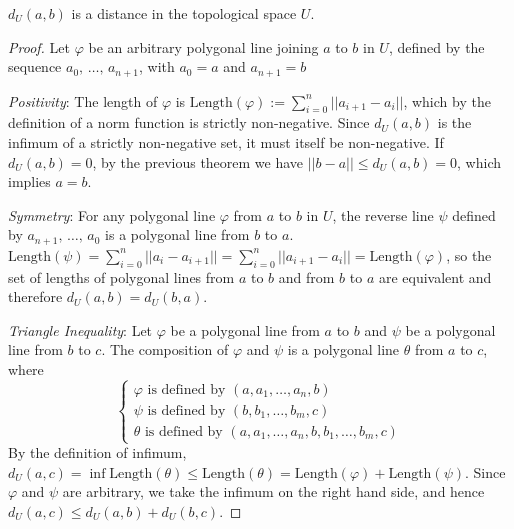 \begin{theorem}
    \label{thm:d_U_is_a_distance}
    \leanok
    $d_U(a,b)$ is a distance in the topological space $U$.
\end{theorem}
\begin{proof}
    Let $\varphi$ be an arbitrary polygonal line joining $a$ to $b$ in $U$,
    defined by the sequence $a_0,\, \dots,\, a_{n + 1}$, with $a_0 = a$ and $a_{n + 1} = b$

    \textit{Positivity}:
    The length of $\varphi$ is $\text{Length}(\varphi) := \sum_{i=0}^{n}||a_{i + 1} - a_i||$,
    which by the definition of a norm function is strictly non-negative.
    Since $d_U(a,b)$ is the infimum of a strictly non-negative set, it must itself be non-negative.
    If $d_U(a,b) = 0$, by the previous theorem we have $||b - a|| \leq d_U(a,b) = 0$,
    which implies $a = b$.

    \textit{Symmetry}:
    For any polygonal line $\varphi$ from $a$ to $b$ in $U$,
    the reverse line $\psi$ defined by $a_{n+1},\, \dots,\, a_0$ is a polygonal line from $b$ to $a$.
    $\text{Length}(\psi) = \sum_{i=0}^{n}||a_i - a_{i + 1}|| = \sum_{i=0}^{n}||a_{i+1} - a_i|| = \text{Length}(\varphi)$,
    so the set of lengths of polygonal lines from $a$ to $b$ and from $b$ to $a$ are equivalent and therefore $d_U(a,b) = d_U(b,a)$.

    \textit{Triangle Inequality}:
    Let $\varphi$ be a polygonal line from $a$ to $b$ and $\psi$ be a polygonal line from $b$ to $c$.
    The composition of $\varphi$ and $\psi$ is a polygonal line $\theta$ from $a$ to $c$, where
    \[
        \begin{cases}
            \varphi \text{ is defined by } (a, a_1, \dots, a_n, b) \\
            \psi \text{ is defined by } (b, b_1, \dots, b_m, c)\\
            \theta \text{ is defined by } (a, a_1, \dots, a_n, b, b_1, \dots, b_m, c)
        \end{cases}
    \]
    By the definition of infimum, $d_U(a,c) = \inf \text{Length}(\theta) \leq \text{Length}(\theta) = \text{Length}(\varphi) + \text{Length}(\psi)$.
    Since $\varphi$ and $\psi$ are arbitrary, we take the infimum on the right hand side,
    and hence $d_U(a,c) \leq d_U(a,b) + d_U(b,c)$.
\end{proof}

